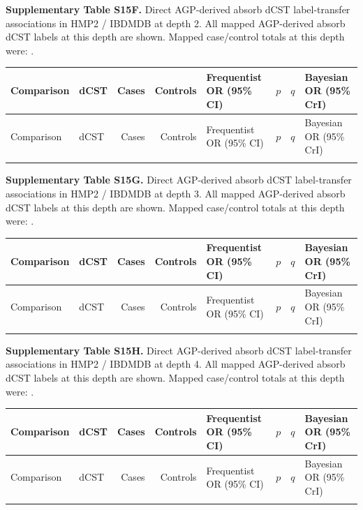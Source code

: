 \noindent\textbf{Supplementary Table S15F.} Direct AGP-derived absorb dCST label-transfer associations in HMP2 / IBDMDB at depth 2. All mapped AGP-derived absorb dCST labels at this depth are shown. Mapped case/control totals at this depth were: .

\begingroup
\scriptsize
\setlength{\tabcolsep}{3pt}
\setlength{\LTleft}{0pt}
\setlength{\LTright}{0pt}
\begin{longtable}{@{} p{} p{} r r p{} p{} p{} p{} @{}}
\toprule
Comparison & dCST & Cases & Controls & Frequentist OR (95\% CI) & \(p\) & \(q\) & Bayesian OR (95\% CrI) \\
\midrule
\endfirsthead
\toprule
Comparison & dCST & Cases & Controls & Frequentist OR (95\% CI) & \(p\) & \(q\) & Bayesian OR (95\% CrI) \\
\midrule
\endhead
\bottomrule
\endfoot
\end{longtable}
\endgroup
\bigskip

\noindent\textbf{Supplementary Table S15G.} Direct AGP-derived absorb dCST label-transfer associations in HMP2 / IBDMDB at depth 3. All mapped AGP-derived absorb dCST labels at this depth are shown. Mapped case/control totals at this depth were: .

\begingroup
\scriptsize
\setlength{\tabcolsep}{3pt}
\setlength{\LTleft}{0pt}
\setlength{\LTright}{0pt}
\begin{longtable}{@{} p{} p{} r r p{} p{} p{} p{} @{}}
\toprule
Comparison & dCST & Cases & Controls & Frequentist OR (95\% CI) & \(p\) & \(q\) & Bayesian OR (95\% CrI) \\
\midrule
\endfirsthead
\toprule
Comparison & dCST & Cases & Controls & Frequentist OR (95\% CI) & \(p\) & \(q\) & Bayesian OR (95\% CrI) \\
\midrule
\endhead
\bottomrule
\endfoot
\end{longtable}
\endgroup
\bigskip

\noindent\textbf{Supplementary Table S15H.} Direct AGP-derived absorb dCST label-transfer associations in HMP2 / IBDMDB at depth 4. All mapped AGP-derived absorb dCST labels at this depth are shown. Mapped case/control totals at this depth were: .

\begingroup
\scriptsize
\setlength{\tabcolsep}{3pt}
\setlength{\LTleft}{0pt}
\setlength{\LTright}{0pt}
\begin{longtable}{@{} p{} p{} r r p{} p{} p{} p{} @{}}
\toprule
Comparison & dCST & Cases & Controls & Frequentist OR (95\% CI) & \(p\) & \(q\) & Bayesian OR (95\% CrI) \\
\midrule
\endfirsthead
\toprule
Comparison & dCST & Cases & Controls & Frequentist OR (95\% CI) & \(p\) & \(q\) & Bayesian OR (95\% CrI) \\
\midrule
\endhead
\bottomrule
\endfoot
\end{longtable}
\endgroup
\bigskip

